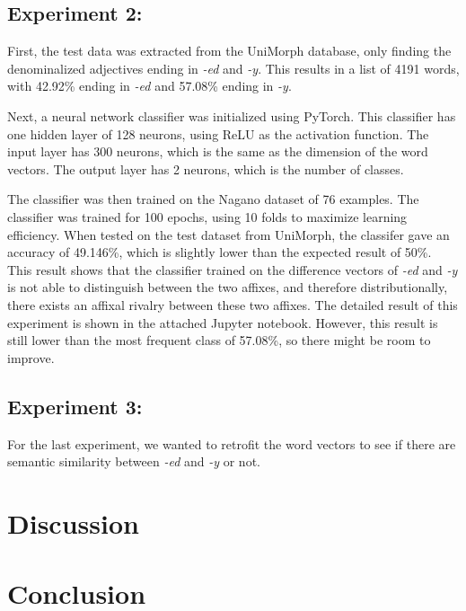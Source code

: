 \documentclass[12pt]{article}
\begin{document}
    \subsection{Experiment 2:}
    First, the test data was extracted from the UniMorph database, only finding the denominalized adjectives ending in \emph{-ed} and \emph{-y}. This results in a list of 4191 words, with 42.92\% ending in \emph{-ed} and 57.08\% ending in \emph{-y}. 

    Next, a neural network classifier was initialized using PyTorch. This classifier has one hidden layer of 128 neurons, using ReLU as the activation function. The input layer has 300 neurons, which is the same as the dimension of the word vectors. The output layer has 2 neurons, which is the number of classes.  
    
    The classifier was then trained on the Nagano dataset of 76 examples. The classifier was trained for 100 epochs, using 10 folds to maximize learning efficiency. When tested on the test dataset from UniMorph, the classifer gave an accuracy of 49.146\%, which is slightly lower than the expected result of 50\%. This result shows that the classifier trained on the difference vectors of \emph{-ed} and \emph{-y} is not able to distinguish between the two affixes, and therefore distributionally, there exists an affixal rivalry between these two affixes. The detailed result of this experiment is shown in the attached Jupyter notebook. However, this result is still lower than the most frequent class of 57.08\%, so there might be room to improve. 

    \subsection{Experiment 3:}
    For the last experiment, we wanted to retrofit the word vectors to see if there are semantic similarity between \emph{-ed} and \emph{-y} or not. 


\section{Discussion}

\section{Conclusion}    

\nocite{*}

\end{document}
